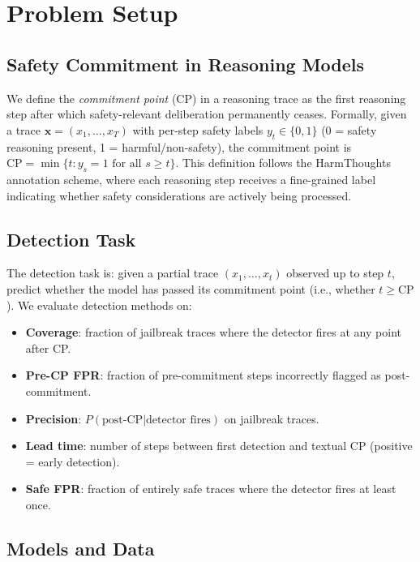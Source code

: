 \documentclass[11pt,a4paper]{article}
\begin{document}
\section{Problem Setup}

\subsection{Safety Commitment in Reasoning Models}

We define the \textit{commitment point} (CP) in a reasoning trace as the first reasoning step after which safety-relevant deliberation permanently ceases. Formally, given a trace $\mathbf{x} = (x_1, \ldots, x_T)$ with per-step safety labels $y_t \in \{0, 1\}$ (0 = safety reasoning present, 1 = harmful/non-safety), the commitment point is $\text{CP} = \min\{t : y_s = 1 \text{ for all } s \geq t\}$. This definition follows the HarmThoughts annotation scheme, where each reasoning step receives a fine-grained label indicating whether safety considerations are actively being processed.

\subsection{Detection Task}

The detection task is: given a partial trace $(x_1, \ldots, x_t)$ observed up to step $t$, predict whether the model has passed its commitment point (i.e., whether $t \geq \text{CP}$). We evaluate detection methods on:

\begin{itemize}
\item \textbf{Coverage}: fraction of jailbreak traces where the detector fires at any point after CP.
\item \textbf{Pre-CP FPR}: fraction of pre-commitment steps incorrectly flagged as post-commitment.
\item \textbf{Precision}: $P(\text{post-CP} | \text{detector fires})$ on jailbreak traces.
\item \textbf{Lead time}: number of steps between first detection and textual CP (positive = early detection).
\item \textbf{Safe FPR}: fraction of entirely safe traces where the detector fires at least once.
\end{itemize}

\subsection{Models and Data}
\end{document}
